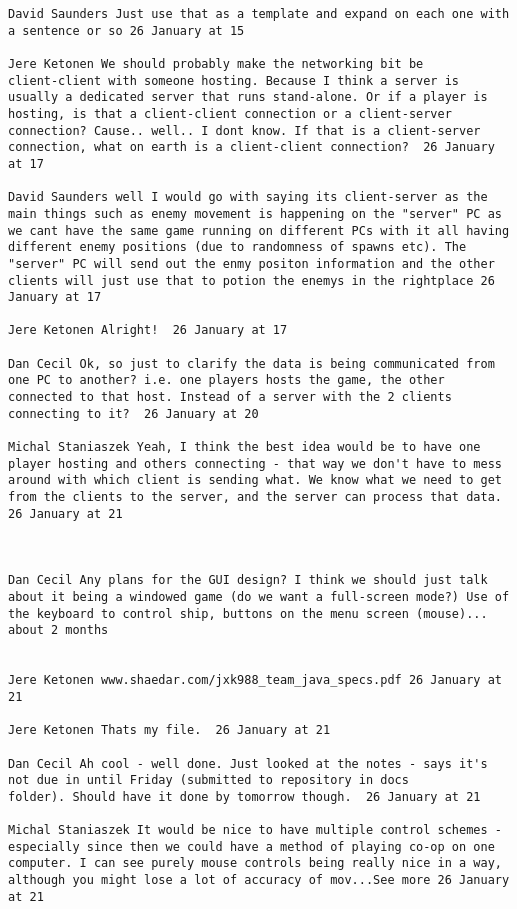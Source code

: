\documentclass[10pt]{report}
\begin{document}
\begin{verbatim}
David Saunders Just use that as a template and expand on each one with
a sentence or so 26 January at 15

Jere Ketonen We should probably make the networking bit be
client-client with someone hosting. Because I think a server is
usually a dedicated server that runs stand-alone. Or if a player is
hosting, is that a client-client connection or a client-server
connection? Cause.. well.. I dont know. If that is a client-server
connection, what on earth is a client-client connection?  26 January
at 17

David Saunders well I would go with saying its client-server as the
main things such as enemy movement is happening on the "server" PC as
we cant have the same game running on different PCs with it all having
different enemy positions (due to randomness of spawns etc). The
"server" PC will send out the enmy positon information and the other
clients will just use that to potion the enemys in the rightplace 26
January at 17

Jere Ketonen Alright!  26 January at 17

Dan Cecil Ok, so just to clarify the data is being communicated from
one PC to another? i.e. one players hosts the game, the other
connected to that host. Instead of a server with the 2 clients
connecting to it?  26 January at 20

Michal Staniaszek Yeah, I think the best idea would be to have one
player hosting and others connecting - that way we don't have to mess
around with which client is sending what. We know what we need to get
from the clients to the server, and the server can process that data.
26 January at 21



Dan Cecil Any plans for the GUI design? I think we should just talk
about it being a windowed game (do we want a full-screen mode?) Use of
the keyboard to control ship, buttons on the menu screen (mouse)...
about 2 months 
 

Jere Ketonen www.shaedar.com/jxk988_team_java_specs.pdf 26 January at 21

Jere Ketonen Thats my file.  26 January at 21

Dan Cecil Ah cool - well done. Just looked at the notes - says it's
not due in until Friday (submitted to repository in docs
folder). Should have it done by tomorrow though.  26 January at 21

Michal Staniaszek It would be nice to have multiple control schemes -
especially since then we could have a method of playing co-op on one
computer. I can see purely mouse controls being really nice in a way,
although you might lose a lot of accuracy of mov...See more 26 January
at 21


\end{verbatim}
\end{document}

